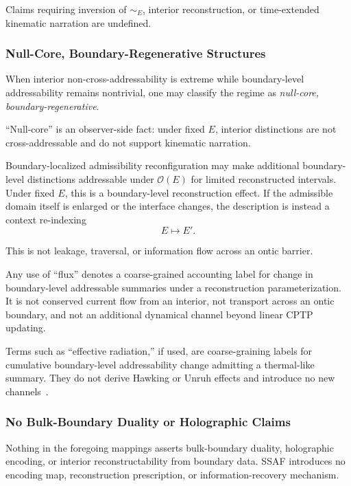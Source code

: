 \documentclass[aps,prx,onecolumn,11pt]{revtex4-2}
\theoremstyle{plain}
\theoremstyle{definition}
\theoremstyle{remark}
\begin{document}
Claims requiring inversion of \(\sim_E\), interior reconstruction, or
time-extended kinematic narration are undefined.

\subsubsection{Null-Core, Boundary-Regenerative Structures}
\label{appB:null_core_boundary_regenerative}

When interior non-cross-addressability is extreme while boundary-level
addressability remains nontrivial, one may classify the regime as
\emph{null-core, boundary-regenerative}.

``Null-core'' is an observer-side fact: under fixed \(E\), interior
distinctions are not cross-addressable and do not support kinematic
narration.

Boundary-localized admissibility reconfiguration may make additional
boundary-level distinctions addressable under \(\mathcal O(E)\) for
limited reconstructed intervals. Under fixed \(E\), this is a
boundary-level reconstruction effect. If the admissible domain itself is
enlarged or the interface changes, the description is instead a
context re-indexing
\[
E\mapsto E'.
\]

This is not leakage, traversal, or information flow across an ontic
barrier.

Any use of ``flux'' denotes a coarse-grained accounting label for
change in boundary-level addressable summaries under a reconstruction
parameterization. It is not conserved current flow from an interior, not
transport across an ontic boundary, and not an additional dynamical
channel beyond linear CPTP updating.

Terms such as ``effective radiation,'' if used, are coarse-graining
labels for cumulative boundary-level addressability change admitting a
thermal-like summary. They do not derive Hawking or Unruh effects and
introduce no new channels~\cite{Hawking1975,Unruh1976}.

\subsubsection{No Bulk-Boundary Duality or Holographic Claims}
\label{appB:scope_holography_limit}

Nothing in the foregoing mappings asserts bulk-boundary duality,
holographic encoding, or interior reconstructability from boundary data.
SSAF introduces no encoding map, reconstruction prescription, or
information-recovery mechanism.
\end{document}
